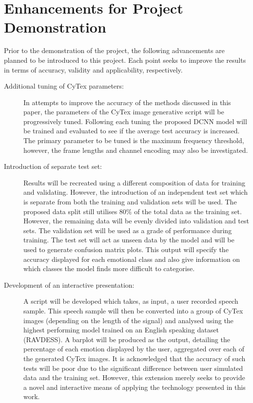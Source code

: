 \section{Enhancements for Project Demonstration}
Prior to the demonstration of the project, the following advancements are planned to be introduced to this project. Each point seeks to improve the results in terms of accuracy, validity and applicability, respectively.
\begin{description}
\item[Additional tuning of CyTex parameters:]
In attempts to improve the accuracy of the methods discussed in this paper, the parameters of the CyTex image generative script will be progressively tuned. Following each tuning the proposed DCNN model will be trained and evaluated to see if the average test accuracy is increased. The primary parameter to be tuned is the maximum frequency threshold, however, the frame lengths and channel encoding may also be investigated. 

\item[Introduction of separate test set:]
Results will be recreated using a different composition of data for training and validating. However, the introduction of an independent test set which is separate from both the training and validation sets will be used. The proposed data split still utilises $80\%$ of the total data as the training set. However, the remaining data will be evenly divided into validation and test sets. The validation set will be used as a grade of performance during training. The test set will act as unseen data by the model and will be used to generate confusion matrix plots. This output will specify the accuracy displayed for each emotional class and also give information on which classes the model finds more difficult to categorise. 

\item[Development of an interactive presentation:]
A script will be developed which takes, as input, a user recorded speech sample. This speech sample will then be converted into a group of CyTex images (depending on the length of the signal) and analysed using the highest performing model trained on an English speaking dataset (RAVDESS). A barplot will be produced as the output, detailing the percentage of each emotion displayed by the user, aggregated over each of the generated CyTex images. It is acknowledged that the accuracy of such tests will be poor due to the significant difference between user simulated data and the training set. However, this extension merely seeks to provide a novel and interactive means of applying the technology presented in this work.

\end{description}

